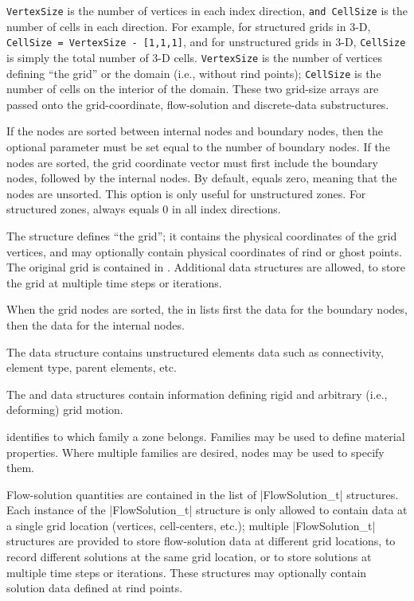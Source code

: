 \texttt{VertexSize} is the number of vertices in each index direction,
\texttt{and CellSize} is the number of cells in each direction.
For example, for structured grids in 3-D, \texttt{CellSize = VertexSize -
[1,1,1]}, and for unstructured grids in 3-D, \texttt{CellSize} is
simply the total number of 3-D cells.
\texttt{VertexSize} is the number of vertices defining ``the grid'' or
the domain (i.e., without rind points); \texttt{CellSize} is the number
of cells on the interior of the domain.
These two grid-size arrays are passed onto the grid-coordinate,
flow-solution and discrete-data substructures.

If the nodes are sorted between internal nodes and boundary nodes,
then the optional parameter  must be set equal
to the number of boundary nodes.
If the nodes are sorted, the grid coordinate vector must first include
the boundary nodes, followed by the internal nodes.
By default,  equals zero, meaning that the nodes
are unsorted.
This option is only useful for unstructured zones.
For structured zones,  always equals 0 in all
index directions.

The  structure defines ``the grid''; it contains
the physical coordinates of the grid vertices, and may optionally
contain physical coordinates of rind or ghost points.
The original grid is contained in .
Additional  data structures are allowed, to
store the grid at multiple time steps or iterations.

When the grid nodes are sorted, the  in
 lists first the data for the boundary nodes,
then the data for the internal nodes.

The  data structure contains unstructured elements
data such as connectivity, element type, parent elements, etc.

The  and  data
structures contain information defining rigid and arbitrary (i.e.,
deforming) grid motion.

 identifies to which family a zone belongs.
Families may be used to define material properties.
Where multiple families are desired,  
nodes may be used to specify them. 

Flow-solution quantities are contained in the list of |FlowSolution_t|
structures.
Each instance of the |FlowSolution_t| structure is only allowed to
contain data at a single grid location (vertices, cell-centers, etc.);
multiple |FlowSolution_t| structures are provided to store flow-solution
data at different grid locations, to record different solutions at
the same grid location, or to store solutions at multiple time steps
or iterations.
These structures may optionally contain solution data defined at rind
points.


